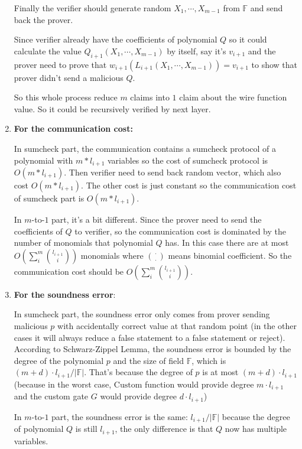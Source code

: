 \documentclass[12pt]{article}
\newenvironment{sol}[1][Solution]{\begin{trivlist}
\item[\hskip \labelsep {\bfseries #1:}]}{\end{trivlist}}
\begin{document}
\begin{sol}
\begin{enumerate}
              Finally the verifier should generate random $X_1, \cdots, X_{m-1}$ from $\mathbb{F}$ and send back the prover.

              Since verifier already have the coefficients of polynomial $Q$ so it could calculate the value $Q_{i+1}(X_1, \cdots, X_{m-1})$ by itself, say it's $v_{i+1}$ and the prover need to prove that $w_{i+1}(L_{i+1}(X_1, \cdots, X_{m-1})) = v_{i+1}$ to show that prover didn't send a malicious $Q$.

              So this whole process reduce $m$ claims into $1$ claim about the wire function value. So it could be recursively verified by next layer.

        \item \textbf{For the communication cost:}

              In sumcheck part, the communication contains a sumcheck protocol of a polynomial with $m * l_{i+1}$ variables so the cost of sumcheck protocol is $O(m * l_{i+1})$. Then verifier need to send back random vector, which also cost $O(m * l_{i+1})$. The other cost is just constant so the communication cost of sumcheck part is $O(m * l_{i+1})$.

              In $m$-to-$1$ part, it's a bit different. Since the prover need to send the coefficients of $Q$ to verifier, so the communication cost is dominated by the number of monomials that polynomial $Q$ has. In this case there are at most $O(\sum_i^m \binom{l_{i+1}}{i})$ monomials where $\binom{\cdot}{\cdot}$ means binomial coefficient. So the communication cost should be $O(\sum_i^m \binom{l_{i+1}}{i})$.

        \item \textbf{For the soundness error}:

              In sumcheck part, the soundness error only comes from prover sending malicious $p$ with accidentally correct value at that random point (in the other cases it will always reduce a false statement to a false statement or reject). According to Schwarz-Zippel Lemma, the soundness error is bounded by the degree of the polynomial $p$ and the size of field $\mathbb{F}$, which is $(m+d) \cdot l_{i+1} / |\mathbb{F}|$. That's because the degree of $p$ is at most $(m+d) \cdot l_{i+1}$ (because in the worst case, $\text{Custom}$ function would provide degree $m \cdot l_{i+1}$ and the custom gate $G$ would provide degree $d \cdot l_{i+1}$)

              In $m$-to-$1$ part, the soundness error is the same: $l_{i+1} / |\mathbb{F}|$ because the degree of polynomial $Q$ is still $l_{i+1}$, the only difference is that $Q$ now has multiple variables.
    \end{enumerate}
\end{sol}
\end{document}

